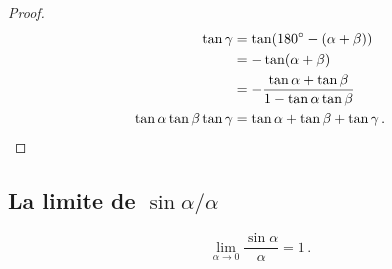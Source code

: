 \begin{proof}
\begin{align*}
\tan\gamma &= \tan (180^\circ-(\alpha+\beta))\\
&= -\tan (\alpha+\beta)\\
&= -\frac{\tan\alpha+\tan\beta}{1-\tan\alpha\tan\beta}\\
\tan\alpha\tan\beta\tan\gamma &=\tan\alpha+\tan\beta+\tan\gamma\,.\qedhere
\end{align*}

\end{proof}




\subsection{La limite de $\sin\alpha/\alpha$}\label{s.sin-over-x}


\begin{theorem}\label{thm.limit-sine-over}
\[
\lim_{\alpha\rightarrow 0}\frac{\sin\alpha}{\alpha}=1\,.
\]
\end{theorem}

